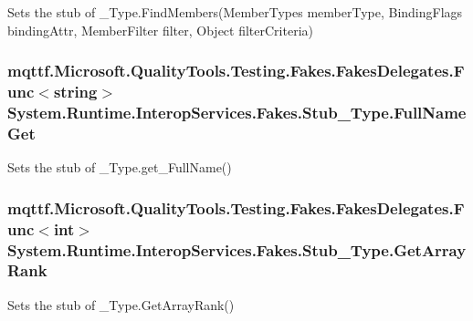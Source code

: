 Sets the stub of \-\_\-\-Type.\-Find\-Members(\-Member\-Types member\-Type, Binding\-Flags binding\-Attr, Member\-Filter filter, Object filter\-Criteria)

\hypertarget{class_system_1_1_runtime_1_1_interop_services_1_1_fakes_1_1_stub___type_ad73767aa4833946189ac4a66c8471f65}{
\subsubsection[{Full\-Name\-Get}]{\setlength{\rightskip}{0pt plus 5cm}mqttf.\-Microsoft.\-Quality\-Tools.\-Testing.\-Fakes.\-Fakes\-Delegates.\-Func$<$string$>$ System.\-Runtime.\-Interop\-Services.\-Fakes.\-Stub\-\_\-\-Type.\-Full\-Name\-Get}}\label{class_system_1_1_runtime_1_1_interop_services_1_1_fakes_1_1_stub___type_ad73767aa4833946189ac4a66c8471f65}


Sets the stub of \-\_\-\-Type.\-get\-\_\-\-Full\-Name()

\hypertarget{class_system_1_1_runtime_1_1_interop_services_1_1_fakes_1_1_stub___type_a6943017a4faae31c1fca18cfaf32c186}{
\subsubsection[{Get\-Array\-Rank}]{\setlength{\rightskip}{0pt plus 5cm}mqttf.\-Microsoft.\-Quality\-Tools.\-Testing.\-Fakes.\-Fakes\-Delegates.\-Func$<$int$>$ System.\-Runtime.\-Interop\-Services.\-Fakes.\-Stub\-\_\-\-Type.\-Get\-Array\-Rank}}\label{class_system_1_1_runtime_1_1_interop_services_1_1_fakes_1_1_stub___type_a6943017a4faae31c1fca18cfaf32c186}


Sets the stub of \-\_\-\-Type.\-Get\-Array\-Rank()

